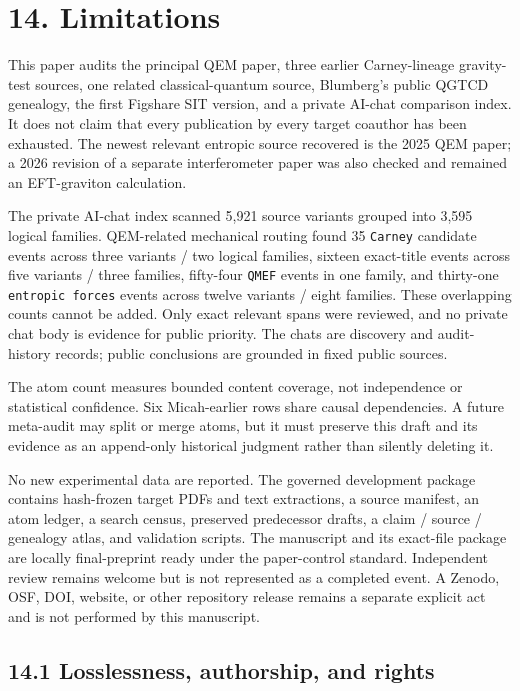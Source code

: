 \documentclass[
  american,
  11pt,
  letterpaper,
]{article}
\begin{document}
\section{14. Limitations}\label{limitations}

This paper audits the principal QEM paper, three earlier Carney-lineage gravity-test sources, one related classical-quantum source, Blumberg's public QGTCD genealogy, the first Figshare SIT version, and a private AI-chat comparison index. It does not claim that every publication by every target coauthor has been exhausted. The newest relevant entropic source recovered is the 2025 QEM paper; a 2026 revision of a separate interferometer paper was also checked and remained an EFT-graviton calculation.

The private AI-chat index scanned 5,921 source variants grouped into 3,595 logical families. QEM-related mechanical routing found 35 \texttt{Carney} candidate events across three variants / two logical families, sixteen exact-title events across five variants / three families, fifty-four \texttt{QMEF} events in one family, and thirty-one \texttt{entropic\ forces} events across twelve variants / eight families. These overlapping counts cannot be added. Only exact relevant spans were reviewed, and no private chat body is evidence for public priority. The chats are discovery and audit-history records; public conclusions are grounded in fixed public sources.

The atom count measures bounded content coverage, not independence or statistical confidence. Six Micah-earlier rows share causal dependencies. A future meta-audit may split or merge atoms, but it must preserve this draft and its evidence as an append-only historical judgment rather than silently deleting it.

No new experimental data are reported. The governed development package contains hash-frozen target PDFs and text extractions, a source manifest, an atom ledger, a search census, preserved predecessor drafts, a claim / source / genealogy atlas, and validation scripts. The manuscript and its exact-file package are locally final-preprint ready under the paper-control standard. Independent review remains welcome but is not represented as a completed event. A Zenodo, OSF, DOI, website, or other repository release remains a separate explicit act and is not performed by this manuscript.

\subsection{14.1 Losslessness, authorship, and rights}\label{losslessness-authorship-and-rights}
\end{document}
